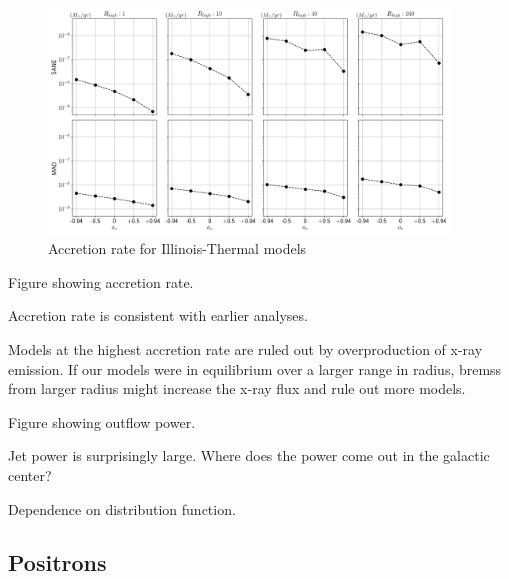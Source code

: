 \begin{figure}
\centering
\includegraphics[width=0.95\textwidth]{figures/illinoisv3_average_munit.png}
\caption{Accretion rate for Illinois-Thermal models}
\label{fig:accretion_illinois_thermal}
\end{figure}

Figure showing accretion rate.

Accretion rate is consistent with earlier analyses.

Models at the highest accretion rate are ruled out by overproduction of x-ray emission.  If our models were in equilibrium over a larger range in radius, bremss from larger radius might increase the x-ray flux and rule out more models.

Figure showing outflow power.

Jet power is surprisingly large.  Where does the power come out in the galactic center?

Dependence on distribution function.



\subsection{Positrons}


